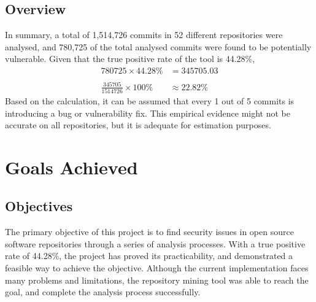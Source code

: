 \documentclass[12pt, a4paper]{report}
\begin{document}
\subsection{Overview}
In summary, a total of 1,514,726 commits in 52 different repositories were analysed, and 780,725 of
the total analysed commits were found to be potentially vulnerable. Given that the true positive
rate of the tool is 44.28\%,
\begin{align*}
  780725 \times 44.28\% &= 345705.03 \\
  \\
  \frac{345705}{1514726} \times 100\% &\approx 22.82\%
\end{align*}
Based on the calculation, it can be assumed that every 1 out of 5 commits is introducing a bug or
vulnerability fix. This empirical evidence might not be accurate on all repositories, but it is
adequate for estimation purposes.

\section{Goals Achieved}
\subsection{Objectives}
The primary objective of this project is to find security issues in open source software
repositories through a series of analysis processes. With a true positive rate of 44.28\%, the
project has proved its practicability, and demonstrated a feasible way to achieve the objective.
Although the current implementation faces many problems and limitations, the repository mining tool
was able to reach the goal, and complete the analysis process successfully.
\end{document}
